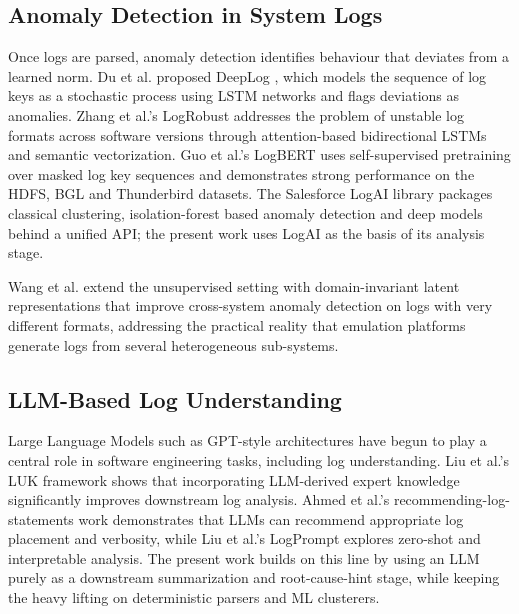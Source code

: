\documentclass[conference]{IEEEtran}
\begin{document}
\subsection{Anomaly Detection in System Logs}
Once logs are parsed, anomaly detection identifies behaviour that deviates from a learned norm. Du et al. proposed DeepLog \cite{du2017deeplog}, which models the sequence of log keys as a stochastic process using LSTM networks and flags deviations as anomalies. Zhang et al.'s LogRobust \cite{zhang2019logrobust} addresses the problem of unstable log formats across software versions through attention-based bidirectional LSTMs and semantic vectorization. Guo et al.'s LogBERT \cite{guo2021logbert} uses self-supervised pretraining over masked log key sequences and demonstrates strong performance on the HDFS, BGL and Thunderbird datasets. The Salesforce LogAI library \cite{cheng2023logai} packages classical clustering, isolation-forest based anomaly detection and deep models behind a unified API; the present work uses LogAI as the basis of its analysis stage.

Wang et al. \cite{wang2025logdlr} extend the unsupervised setting with domain-invariant latent representations that improve cross-system anomaly detection on logs with very different formats, addressing the practical reality that emulation platforms generate logs from several heterogeneous sub-systems.

\subsection{LLM-Based Log Understanding}
Large Language Models such as GPT-style architectures \cite{vaswani2017attention, brown2020gpt3} have begun to play a central role in software engineering tasks, including log understanding. Liu et al.'s LUK framework \cite{liu2025luk} shows that incorporating LLM-derived expert knowledge significantly improves downstream log analysis. Ahmed et al.'s recommending-log-statements work \cite{ahmed2023recommending} demonstrates that LLMs can recommend appropriate log placement and verbosity, while Liu et al.'s LogPrompt \cite{liu2024logprompt} explores zero-shot and interpretable analysis. The present work builds on this line by using an LLM purely as a downstream summarization and root-cause-hint stage, while keeping the heavy lifting on deterministic parsers and ML clusterers.
\end{document}
